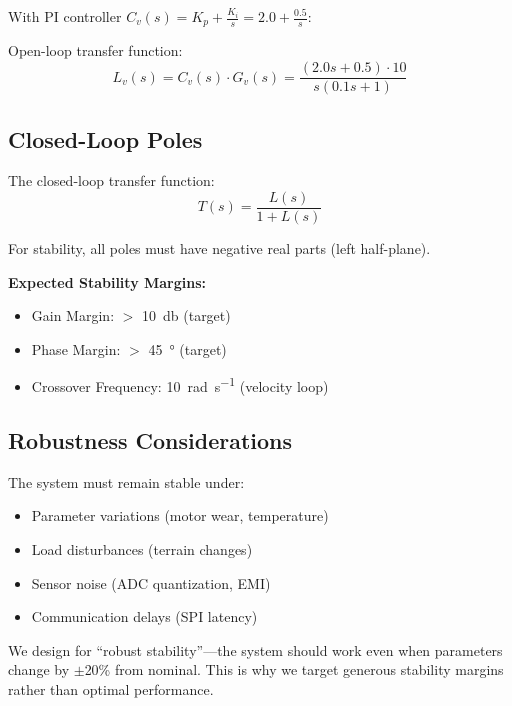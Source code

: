 \documentclass[11pt,letterpaper]{article}
\begin{document}
With PI controller $C_v(s) = K_p + \frac{K_i}{s} = 2.0 + \frac{0.5}{s}$:

Open-loop transfer function:
\begin{equation}
L_v(s) = C_v(s) \cdot G_v(s) = \frac{(2.0s + 0.5) \cdot 10}{s(0.1s + 1)}
\end{equation}

\subsection{Closed-Loop Poles}

The closed-loop transfer function:
\begin{equation}
T(s) = \frac{L(s)}{1 + L(s)}
\end{equation}

For stability, all poles must have negative real parts (left half-plane).

\begin{ournumbers}
\textbf{Expected Stability Margins:}
\begin{itemize}[noitemsep]
    \item Gain Margin: $>$ \SI{10}{\decibel} (target)
    \item Phase Margin: $>$ \SI{45}{\degree} (target)
    \item Crossover Frequency: \SI{10}{\radian\per\second} (velocity loop)
\end{itemize}
\end{ournumbers}

\subsection{Robustness Considerations}

The system must remain stable under:
\begin{itemize}
    \item Parameter variations (motor wear, temperature)
    \item Load disturbances (terrain changes)
    \item Sensor noise (ADC quantization, EMI)
    \item Communication delays (SPI latency)
\end{itemize}

\begin{whymatters}
We design for ``robust stability''---the system should work even when parameters change by $\pm$20\% from nominal. This is why we target generous stability margins rather than optimal performance.
\end{whymatters}
\end{document}
